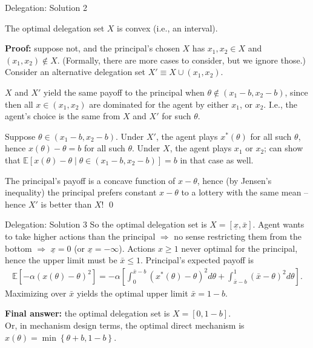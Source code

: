 \documentclass[english,10pt
,aspectratio=169
]{beamer}
\begin{document}
\begin{frame}{Delegation: Solution 2}
	\begin{lemma}
		The optimal delegation set $X$ is convex (i.e., an interval).
	\end{lemma}
	\textbf{Proof:} suppose not, and the principal's chosen $X$ has $x_1,x_2 \in X$ and $(x_1,x_2) \notin X$. (Formally, there are more cases to consider, but we ignore those.)
	Consider an alternative delegation set $X' \equiv X \cup (x_1, x_2)$.
	
	$X$ and $X'$ yield the same payoff to the principal when $\theta \notin (x_1-b, x_2-b)$, since then all $x \in (x_1, x_2)$ are dominated for the agent by either $x_1$, or $x_2$. I.e., the agent's choice is the same from $X$ and $X'$ for such $\theta$.
	
	Suppose $\theta \in (x_1-b, x_2-b)$. Under $X'$, the agent plays $x^*(\theta)$ for all such $\theta$, hence $x(\theta)-\theta = b$ for all such $\theta$.
	Under $X$, the agent plays $x_1$ or $x_2$; can show that $\mathbb{E} \left[ x(\theta)-\theta \mid \theta \in (x_1-b, x_2-b) \right] = b$ in that case as well.
	
	The principal's payoff is a concave function of $x-\theta$, hence (by Jensen's inequality) the principal prefers constant $x-\theta$ to a lottery with the same mean -- hence $X'$ is better than $X$! \qed 
\end{frame}


\begin{frame}{Delegation: Solution 3}
	So the optimal delegation set is $X = [\underline{x}, \bar{x}]$. Agent wants to take higher actions than the principal $\Rightarrow$ no sense restricting them from the bottom $\Rightarrow$ $\underline{x}=0$ (or $\underline{x}=-\infty$). Actions $x \geq 1$ never optimal for the principal, hence the upper limit must be $\bar{x} \leq 1$. Principal's expected payoff is
	\begin{align*}
		\mathbb{E}\left[-\alpha \left( x(\theta) - \theta \right)^2 \right]
		= -\alpha \left[ \int_0^{\bar{x}-b} \left(x^*(\theta)-\theta \right)^2 d\theta + \int_{\bar{x}-b}^{1} (\bar{x}-\theta)^2 d\theta \right].
	\end{align*}
	Maximizing over $\bar{x}$ yields the optimal upper limit $\bar{x} = 1-b$.
	
	\textbf{Final answer:} the optimal delegation set is $X = [0, 1-b]$. \\
	Or, in mechanism design terms, the optimal direct mechanism is $x(\theta) = \min \left\{ \theta+b, 1-b \right\}$.
\end{frame}
\end{document}
